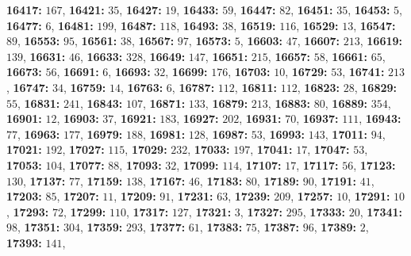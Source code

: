 \textsf{\bfseries 16417:} $167$, \textsf{\bfseries 16421:} $35$, \textsf{\bfseries 16427:} $19$, \textsf{\bfseries 16433:} $59$, \textsf{\bfseries 16447:} $82$, \textsf{\bfseries 16451:} $35$, \textsf{\bfseries 16453:} $5$, \textsf{\bfseries 16477:} $6$, \textsf{\bfseries 16481:} $199$, \textsf{\bfseries 16487:} $118$, \textsf{\bfseries 16493:} $38$, \textsf{\bfseries 16519:} $116$, \textsf{\bfseries 16529:} $13$, \textsf{\bfseries 16547:} $89$, \textsf{\bfseries 16553:} $95$, \textsf{\bfseries 16561:} $38$, \textsf{\bfseries 16567:} $97$, \textsf{\bfseries 16573:} $5$, \textsf{\bfseries 16603:} $47$, \textsf{\bfseries 16607:} $213$, \textsf{\bfseries 16619:} $139$, \textsf{\bfseries 16631:} $46$, \textsf{\bfseries 16633:} $328$, \textsf{\bfseries 16649:} $147$, \textsf{\bfseries 16651:} $215$, \textsf{\bfseries 16657:} $58$, \textsf{\bfseries 16661:} $65$, \textsf{\bfseries 16673:} $56$, \textsf{\bfseries 16691:} $6$, \textsf{\bfseries 16693:} $32$, \textsf{\bfseries 16699:} $176$, \textsf{\bfseries 16703:} $10$, \textsf{\bfseries 16729:} $53$, \textsf{\bfseries 16741:} $213$, \textsf{\bfseries 16747:} $34$, \textsf{\bfseries 16759:} $14$, \textsf{\bfseries 16763:} $6$, \textsf{\bfseries 16787:} $112$, \textsf{\bfseries 16811:} $112$, \textsf{\bfseries 16823:} $28$, \textsf{\bfseries 16829:} $55$, \textsf{\bfseries 16831:} $241$, \textsf{\bfseries 16843:} $107$, \textsf{\bfseries 16871:} $133$, \textsf{\bfseries 16879:} $213$, \textsf{\bfseries 16883:} $80$, \textsf{\bfseries 16889:} $354$, \textsf{\bfseries 16901:} $12$, \textsf{\bfseries 16903:} $37$, \textsf{\bfseries 16921:} $183$, \textsf{\bfseries 16927:} $202$, \textsf{\bfseries 16931:} $70$, \textsf{\bfseries 16937:} $111$, \textsf{\bfseries 16943:} $77$, \textsf{\bfseries 16963:} $177$, \textsf{\bfseries 16979:} $188$, \textsf{\bfseries 16981:} $128$, \textsf{\bfseries 16987:} $53$, \textsf{\bfseries 16993:} $143$, \textsf{\bfseries 17011:} $94$, \textsf{\bfseries 17021:} $192$, \textsf{\bfseries 17027:} $115$, \textsf{\bfseries 17029:} $232$, \textsf{\bfseries 17033:} $197$, \textsf{\bfseries 17041:} $17$, \textsf{\bfseries 17047:} $53$, \textsf{\bfseries 17053:} $104$, \textsf{\bfseries 17077:} $88$, \textsf{\bfseries 17093:} $32$, \textsf{\bfseries 17099:} $114$, \textsf{\bfseries 17107:} $17$, \textsf{\bfseries 17117:} $56$, \textsf{\bfseries 17123:} $130$, \textsf{\bfseries 17137:} $77$, \textsf{\bfseries 17159:} $138$, \textsf{\bfseries 17167:} $46$, \textsf{\bfseries 17183:} $80$, \textsf{\bfseries 17189:} $90$, \textsf{\bfseries 17191:} $41$, \textsf{\bfseries 17203:} $85$, \textsf{\bfseries 17207:} $11$, \textsf{\bfseries 17209:} $91$, \textsf{\bfseries 17231:} $63$, \textsf{\bfseries 17239:} $209$, \textsf{\bfseries 17257:} $10$, \textsf{\bfseries 17291:} $10$, \textsf{\bfseries 17293:} $72$, \textsf{\bfseries 17299:} $110$, \textsf{\bfseries 17317:} $127$, \textsf{\bfseries 17321:} $3$, \textsf{\bfseries 17327:} $295$, \textsf{\bfseries 17333:} $20$, \textsf{\bfseries 17341:} $98$, \textsf{\bfseries 17351:} $304$, \textsf{\bfseries 17359:} $293$, \textsf{\bfseries 17377:} $61$, \textsf{\bfseries 17383:} $75$, \textsf{\bfseries 17387:} $96$, \textsf{\bfseries 17389:} $2$, \textsf{\bfseries 17393:} $141$, 
